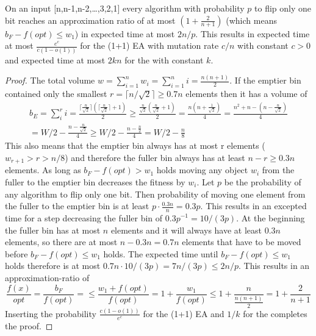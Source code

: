 \begin{lemma}
    On an input [n,n-1,n-2,\dots,3,2,1] every algorithm with probability $p$ to flip only one bit reaches an approximation ratio of at most $(1+\frac{2}{n+1})$ (which means $b_F-f(opt)\le w_1$) in expected time at most $2n/p$.
    This results in expected time at most $\frac{e^c}{c(1-o(1))}$ for the (1+1) EA with mutation rate $c/n$ with constant $c>0$ and expected time at most $2kn$ for the \RLSR[k] with constant $k$.
\end{lemma}
\begin{proof}
    The total volume \(w=\sum_{i=1}^{n}{w_i}=\sum_{i=1}^{n}{i}=\frac{n(n+1)}{2}\).
    If the emptier bin contained only the smallest $r=\lceil n/\sqrt{2}\rceil\ge 0.7n$ elements then it has a volume of
    \begin{gather}\nonumber
        b_E=\sum_{i}^{r}{i}
        =\frac{\lceil \frac{n}{\sqrt{2}}\rceil(\lceil \frac{n}{\sqrt{2}}\rceil+1)}{2}
        \ge\frac{\frac{n}{\sqrt{2}}(\frac{n}{\sqrt{2}}+1)}{2}
        =\frac{n(n+\frac{1}{\sqrt{2}})}{4}
        =\frac{n^2+n-(n-\frac{n}{\sqrt{2}})}{4}\\ \nonumber
        =W/2-\frac{n-\frac{n}{\sqrt{2}}}{4}
        \ge W/2-\frac{n-\frac{n}{2}}{4}
        = W/2-\frac{n}{8}
    \end{gather}
    This also means that the emptier bin always has at most r elements ($w_{r+1}>r>n/8$) and therefore the fuller bin always has at least $n-r\ge 0.3n$ elements.
    As long as $b_F-f(opt)>w_1$ holds moving any object $w_i$ from the fuller to the emptier bin decreases the fitness by $w_i$.
    Let $p$ be the probability of any algorithm to flip only one bit.
    Then probability of moving one element from the fuller to the emptier bin is at least $p\cdot\frac{0.3n}{n}=0.3p$.
    This results in an excepted time for a step decreasing the fuller bin of ${0.3p}^{-1}=10/(3p)$.
    At the beginning the fuller bin has at most $n$ elements and it will always have at least $0.3n$ elements, so there are at most $n-0.3n=0.7n$ elements that have to be moved before $b_F-f(opt)\le w_1$ holds.
    The expected time until $b_F-f(opt)\le w_1$ holds therefore is at most \(0.7n\cdot10/(3p)=7n/(3p)\le 2n/p\).
    This results in an approximation-ratio of
    \[
        \frac{f(x)}{opt}
        =\frac{b_F}{f(opt)}
        =\le\frac{w_1+f(opt)}{f(opt)}
        =1+\frac{w_1}{f(opt)}
        \le1+\frac{n}{\frac{n(n+1)}{2}}
        =1+\frac{2}{n+1}
    \]
    Inserting the probability $\frac{c(1-o(1))}{e^c}$ for the (1+1) EA and $1/k$ for the \RLSR[k] completes the proof.
\end{proof}

